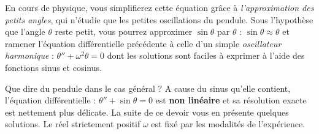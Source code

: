 \documentclass[a4paper,french,bookmarks]{article}
\begin{document}
En cours de physique, vous simplifierez cette équation grâce à \textit{l’approximation des petits angles}, qui n'étudie que les petites oscillations du pendule. Sous l'hypothèse que l'angle $\theta$ reste petit, vous pourrez approximer $\sin \theta$ par $\theta$ : $\sin \theta \approx \theta$ et ramener l'équation différentielle précédente à celle d'un simple \textit{oscillateur harmonique} : $\theta'' + \omega^2\theta = 0$ dont les solutions sont faciles à exprimer à l'aide des fonctions sinus et cosinus.\newline

Que dire du pendule dans le cas général ? A cause du sinus qu'elle contient, l'équation différentielle : $\theta'' + \sin \theta = 0$ est \textbf{non linéaire} et sa résolution exacte est nettement plus délicate. La suite de ce devoir vous en présente quelques solutions. Le réel strictement positif $\omega$ est fixé par les modalités de l'expérience.
\end{document}
